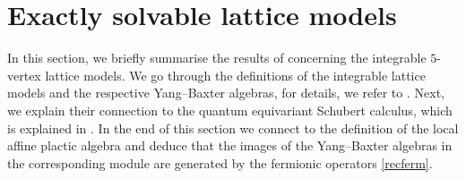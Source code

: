 \documentclass[12pt]{amsart}
\numberwithin{equation}{section}
\numberwithin{figure}{section}
\begin{document}
\section{Exactly solvable lattice models}\label{app:C}
In this section, we briefly summarise the results of \cite{GKS20} concerning the integrable $5$-vertex lattice models. We go through the definitions of the integrable lattice models and the respective Yang--Baxter algebras, for details, we refer to \cite[Sections 1 and 2]{GKS20}. Next, we explain their connection to the quantum equivariant Schubert calculus, which is explained in \cite[Sections 3\hyphen5]{GKS20}. In the end of this section we connect to the definition of the local affine plactic algebra and deduce that the images of the Yang--Baxter algebras in the corresponding module are generated by the fermionic operators \eqref{recferm}.
\end{document}
